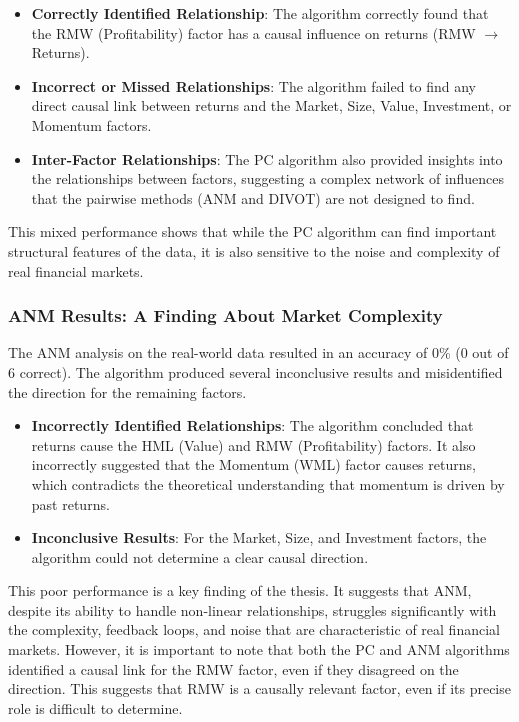 \begin{itemize}
    \item \textbf{Correctly Identified Relationship}: The algorithm correctly found that the RMW (Profitability) factor has a causal influence on returns (RMW $\rightarrow$ Returns).
    
    \item \textbf{Incorrect or Missed Relationships}: The algorithm failed to find any direct causal link between returns and the Market, Size, Value, Investment, or Momentum factors.
    
    \item \textbf{Inter-Factor Relationships}: The PC algorithm also provided insights into the relationships between factors, suggesting a complex network of influences that the pairwise methods (ANM and DIVOT) are not designed to find.
\end{itemize}

This mixed performance shows that while the PC algorithm can find important structural features of the data, it is also sensitive to the noise and complexity of real financial markets.

\subsubsection{ANM Results: A Finding About Market Complexity}

The ANM analysis on the real-world data resulted in an accuracy of 0\% (0 out of 6 correct). The algorithm produced several inconclusive results and misidentified the direction for the remaining factors.

\begin{itemize}
    \item \textbf{Incorrectly Identified Relationships}: The algorithm concluded that returns cause the HML (Value) and RMW (Profitability) factors. It also incorrectly suggested that the Momentum (WML) factor causes returns, which contradicts the theoretical understanding that momentum is driven by past returns.
    \item \textbf{Inconclusive Results}: For the Market, Size, and Investment factors, the algorithm could not determine a clear causal direction.
\end{itemize}

This poor performance is a key finding of the thesis. It suggests that ANM, despite its ability to handle non-linear relationships, struggles significantly with the complexity, feedback loops, and noise that are characteristic of real financial markets. However, it is important to note that both the PC and ANM algorithms identified a causal link for the RMW factor, even if they disagreed on the direction. This suggests that RMW is a causally relevant factor, even if its precise role is difficult to determine.

